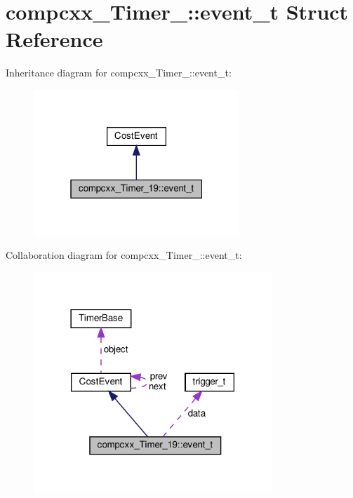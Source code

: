 \hypertarget{structcompcxx__Timer__19_1_1event__t}{}\section{compcxx\+\_\+\+Timer\+\_\+:\+:event\+\_\+t Struct Reference}
\label{structcompcxx__Timer__19_1_1event__t}


Inheritance diagram for compcxx\+\_\+\+Timer\+\_\+:\+:event\+\_\+t\+:\nopagebreak
\begin{figure}[H]
\begin{center}
\leavevmode
\includegraphics[width=220pt]{structcompcxx__Timer__19_1_1event__t__inherit__graph}
\end{center}
\end{figure}


Collaboration diagram for compcxx\+\_\+\+Timer\+\_\+:\+:event\+\_\+t\+:\nopagebreak
\begin{figure}[H]
\begin{center}
\leavevmode
\includegraphics[width=254pt]{structcompcxx__Timer__19_1_1event__t__coll__graph}
\end{center}
\end{figure}
